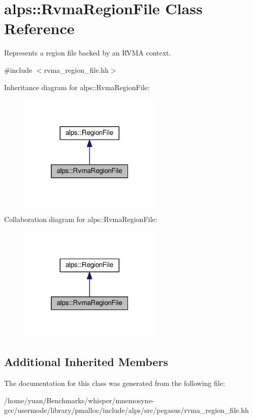 \hypertarget{classalps_1_1RvmaRegionFile}{}\section{alps\+:\+:Rvma\+Region\+File Class Reference}
\label{classalps_1_1RvmaRegionFile}


Represents a region file backed by an R\+V\+MA context.  




{\ttfamily \#include $<$rvma\+\_\+region\+\_\+file.\+hh$>$}



Inheritance diagram for alps\+:\+:Rvma\+Region\+File\+:
\nopagebreak
\begin{figure}[H]
\begin{center}
\leavevmode
\includegraphics[width=193pt]{classalps_1_1RvmaRegionFile__inherit__graph}
\end{center}
\end{figure}


Collaboration diagram for alps\+:\+:Rvma\+Region\+File\+:
\nopagebreak
\begin{figure}[H]
\begin{center}
\leavevmode
\includegraphics[width=193pt]{classalps_1_1RvmaRegionFile__coll__graph}
\end{center}
\end{figure}
\subsection*{Additional Inherited Members}


The documentation for this class was generated from the following file\+:\begin{DoxyCompactItemize}
\item 
/home/yuan/\+Benchmarks/whisper/mnemosyne-\/gcc/usermode/library/pmalloc/include/alps/src/pegasus/rvma\+\_\+region\+\_\+file.\+hh\end{DoxyCompactItemize}
